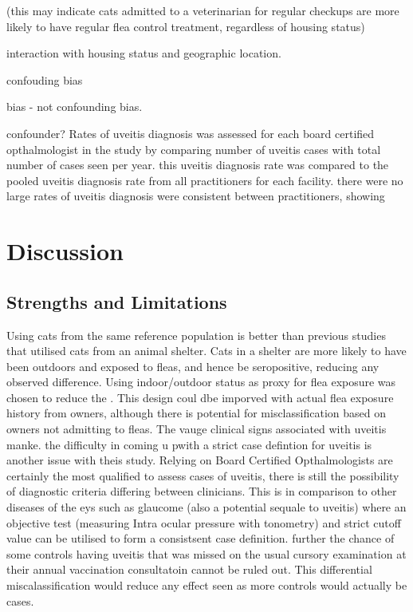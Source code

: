 \documentclass[11pt,twocolumn]{article}
\begin{document}
		(this may indicate cats admitted to a veterinarian for regular checkups are more likely to have regular flea control treatment, regardless of housing status)



		interaction with housing status and geographic location.
		
		confouding bias 

		bias - not confounding bias.


		confounder?
		Rates of uveitis diagnosis was assessed for each board certified opthalmologist in the study by comparing number of uveitis cases with total number of cases seen per year. this uveitis diagnosis rate was compared to the pooled uveitis diagnosis rate from all practitioners for each facility. 
		there were no large 
		rates of uveitis diagnosis were consistent between practitioners, showing 
		


		\newpage
\section{Discussion}
	\subsection{Strengths and Limitations}
		Using cats from the same reference population is better than previous studies that utilised cats from an animal shelter. Cats in a shelter are more likely to have been outdoors and exposed to fleas, and hence be seropositive, reducing any observed difference.
		Using indoor/outdoor status as proxy for flea exposure was chosen to reduce the . 
		This design coul dbe imporved with actual flea exposure history from owners, although there is potential for misclassification based on owners not admitting to fleas.
		The vauge clinical signs associated with uveitis manke.
		the difficulty in coming u pwith a strict case defintion for uveitis is another issue with theis study. Relying on Board Certified Opthalmologists are certainly the most qualified to assess cases of uveitis, there is still the possibility of diagnostic criteria differing between clinicians. This is in comparison to other diseases of the eys such as glaucome (also a potential sequale to uveitis) where an objective test (measuring Intra ocular pressure with tonometry) and strict cutoff value can be utilised to form a consistsent case definition.
		further the chance of some controls having uveitis that was missed on the usual cursory examination at their annual vaccination consultatoin cannot be ruled out. This differential miscalassification would reduce any effect seen as more controls would actually be cases.
\end{document}
